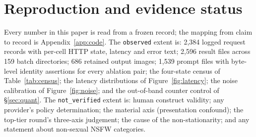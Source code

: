 \documentclass[11pt]{article}
\begin{document}
\section{Reproduction and evidence status}
\label{sec:repro}

Every number in this paper is read from a frozen record; the mapping from claim
to record is Appendix~\ref{app:code}. The \texttt{observed} extent is: 2{,}384
logged request records with per-cell HTTP state, latency and error text;
2{,}596 result files across 159 batch directories; 686 retained output images;
1{,}539 prompt files with byte-level identity assertions for every ablation
pair; the four-state census of Table~\ref{tab:census}; the latency
distributions of Figure~\ref{fig:latency}; the noise calibration of
Figure~\ref{fig:noise}; and the out-of-band counter control of
\S\ref{sec:quant}. The \texttt{not\_verified} extent is: human construct
validity; any provider's policy determination; the material axis (presentation
confound); the top-tier round's three-axis judgement; the cause of the
non-stationarity; and any statement about non-sexual NSFW categories.

\clearpage


\clearpage
\appendix
\renewcommand{\thesection}{\arabic{section}}

\end{document}
